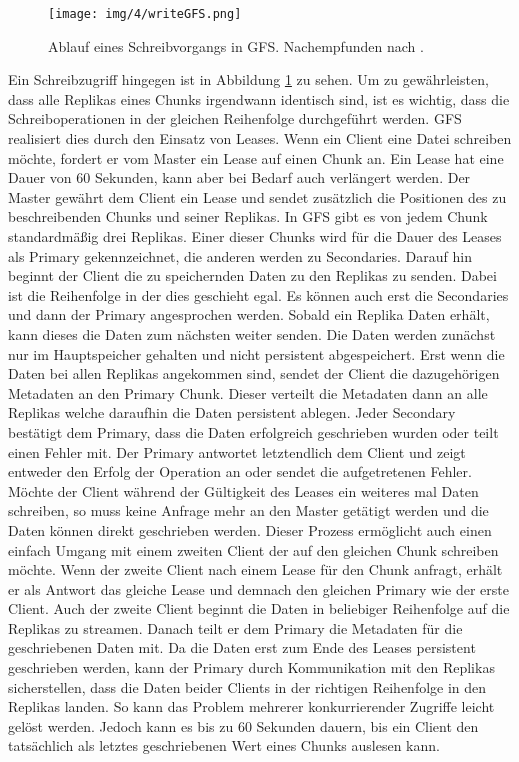 \documentclass[12pt,oneside,a4paper,parskip]{scrbook}
\begin{document}
\begin{figure}[htb]
  \centering
  \texttt{[image: img/4/writeGFS.png]}
  \caption[Schreiben eines Chunks in GFS]{Ablauf eines Schreibvorgangs in GFS. Nachempfunden nach \cite{GFS}.}
  \label{writeGFS}
\end{figure}

Ein Schreibzugriff hingegen ist in Abbildung \ref{writeGFS} zu sehen. Um zu gewährleisten, dass alle Replikas eines Chunks irgendwann identisch sind, ist es wichtig, dass die Schreiboperationen in der gleichen Reihenfolge durchgeführt werden. GFS realisiert dies durch den Einsatz von Leases. Wenn ein Client eine Datei schreiben möchte, fordert er vom Master ein Lease auf einen Chunk an. Ein Lease hat eine Dauer von 60 Sekunden, kann aber bei Bedarf auch verlängert werden. Der Master gewährt dem Client ein Lease und sendet zusätzlich die Positionen des zu beschreibenden Chunks und seiner Replikas. In GFS gibt es von jedem Chunk standardmäßig drei Replikas. Einer dieser Chunks wird für die Dauer des Leases als Primary gekennzeichnet, die anderen werden zu Secondaries. Darauf hin beginnt der Client die zu speichernden Daten zu den Replikas zu senden. Dabei ist die Reihenfolge in der dies geschieht egal. Es können auch erst die Secondaries und dann der Primary angesprochen werden. Sobald ein Replika Daten erhält, kann dieses die Daten zum nächsten weiter senden. Die Daten werden zunächst nur im Hauptspeicher gehalten und nicht persistent abgespeichert. Erst wenn die Daten bei allen Replikas angekommen sind, sendet der Client die dazugehörigen Metadaten an den Primary Chunk. Dieser verteilt die Metadaten dann an alle Replikas welche daraufhin die Daten persistent ablegen. Jeder Secondary bestätigt dem Primary, dass die Daten erfolgreich geschrieben wurden oder teilt einen Fehler mit. Der Primary antwortet letztendlich dem Client und zeigt entweder den Erfolg der Operation an oder sendet die aufgetretenen Fehler. Möchte der Client während der Gültigkeit des Leases ein weiteres mal Daten schreiben, so muss keine Anfrage mehr an den Master getätigt werden und die Daten können direkt geschrieben werden. Dieser Prozess ermöglicht auch einen einfach Umgang mit einem zweiten Client der auf den gleichen Chunk schreiben möchte. Wenn der zweite Client nach einem Lease für den Chunk anfragt, erhält er als Antwort das gleiche Lease und demnach den gleichen Primary wie der erste Client. Auch der zweite Client beginnt die Daten in beliebiger Reihenfolge auf die Replikas zu streamen. Danach teilt er dem Primary die Metadaten für die geschriebenen Daten mit. Da die Daten erst zum Ende des Leases persistent geschrieben werden, kann der Primary durch Kommunikation mit den Replikas sicherstellen, dass die Daten beider Clients in der richtigen Reihenfolge in den Replikas landen. So kann das Problem mehrerer konkurrierender Zugriffe leicht gelöst werden. Jedoch kann es bis zu 60 Sekunden dauern, bis ein Client den tatsächlich als letztes geschriebenen Wert eines Chunks auslesen kann.
\end{document}
